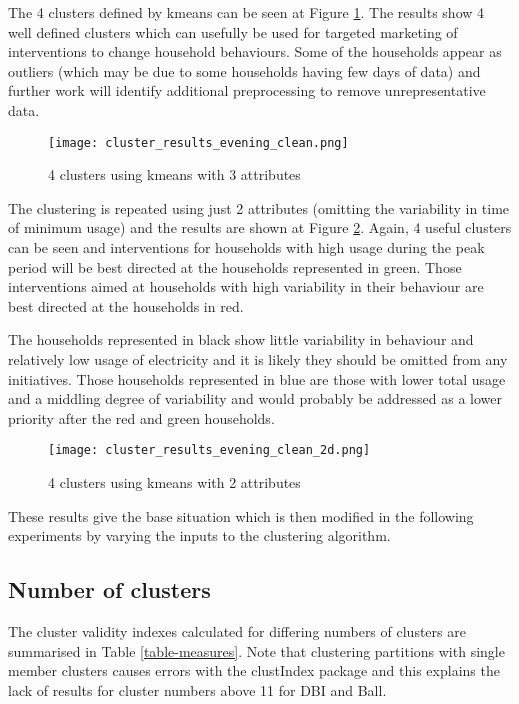 \documentclass[conference]{IEEEtran}
\begin{document}
The 4 clusters defined by kmeans can be seen at Figure \ref{3dclusters}. The results show 4 well defined clusters which can usefully be used for targeted marketing of interventions to change household behaviours. Some of the households appear as outliers (which may be due to some households having few days of data) and further work will identify additional preprocessing to remove unrepresentative data.

\begin{figure}[h]
\centering
\texttt{[image: cluster\_results\_evening\_clean.png]}
\caption{4 clusters using kmeans with 3 attributes}
\label{3dclusters}
\end{figure}

The clustering is repeated using just 2 attributes (omitting the variability in time of minimum usage) and the results are shown at Figure \ref{2dclusters}. Again, 4 useful clusters can be seen and interventions for households with high usage during the peak period will be best directed at the households represented in green. Those interventions aimed at households with high variability in their behaviour are best directed at the households in red.

The households represented in black show little variability in behaviour and relatively low usage of electricity and it is likely they should be omitted from any initiatives. Those households represented in blue are those with lower total usage and a middling degree of variability and would probably be addressed as a lower priority after the red and green households.

\begin{figure}[h]
\centering
\texttt{[image: cluster\_results\_evening\_clean\_2d.png]}
\caption{4 clusters using kmeans with 2 attributes}
\label{2dclusters}
\end{figure}

These results give the base situation which is then modified in the following experiments by varying the inputs to the clustering algorithm.

\subsection{Number of clusters}

The cluster validity indexes calculated for differing numbers of clusters are summarised in Table \ref{table-measures}. Note that clustering partitions with single member clusters causes errors with the clustIndex package and this explains the lack of results for cluster numbers above 11 for DBI and Ball.
\end{document}
